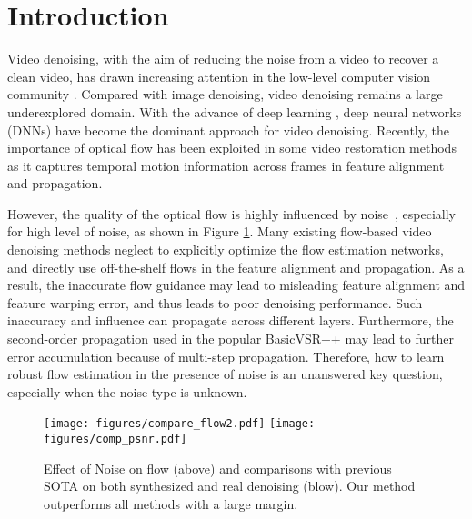 \documentclass[10pt,twocolumn,letterpaper]{article}
\newlength \g
\begin{document}
\section{Introduction}
\label{sec:intro}
\vspace{-2mm}
Video denoising, with the aim of reducing the noise from a video to recover a clean video, has drawn increasing attention in the low-level computer vision community \cite{tassano2019dvdnet,tassano2020fastdvdnet,vaksman2021pacnet,davy2018vnlnet,chan2022basicvsrpp2,lee2021restore,maggioni2021efficient,huang2022neural}.
Compared with image denoising, video denoising remains a large underexplored domain.
With the advance of deep learning \cite{ren2021adaptive,zheng2021deep,zamir2021multi}, deep neural networks (DNNs) \cite{vaksman2021pacnet,tassano2020fastdvdnet,sheth2021unsupervised} have become the dominant approach for video denoising. 
Recently, the importance of optical flow has been exploited in some video restoration methods \cite{wang2019edvr,liang2022vrt,li2022flornn,chan2021basicvsrpp} as it captures temporal motion information across frames in feature alignment and propagation.

However, the quality of the optical flow is highly influenced by noise~\cite{xue2019toflow}, especially for high level of noise, as shown in Figure \ref{fig:noise_flow}.
Many existing flow-based video denoising methods \cite{chan2022basicvsrpp2,liang2022vrt,li2022flornn} neglect to explicitly optimize the flow estimation networks, and directly use off-the-shelf flows in the feature alignment and propagation.
As a result, the inaccurate flow guidance may lead to misleading feature alignment and feature warping error, and thus leads to poor denoising performance.
Such inaccuracy and influence can propagate across different layers.
Furthermore, the second-order propagation used in the popular BasicVSR++ \cite{chan2022basicvsrpp2} may lead to further error accumulation because of multi-step propagation. Therefore, how to learn robust flow estimation in the presence of noise is an unanswered key question, especially when the noise type is unknown. 



\begin{figure}[t]
\begin{center}
\texttt{[image: figures/compare\_flow2.pdf]}
    \vspace{-2mm}
    \texttt{[image: figures/comp\_psnr.pdf]}
    \end{center}
    \vspace{-1mm}
    \caption{Effect of Noise on flow (above) and comparisons with previous SOTA on both synthesized and real denoising (blow). Our method outperforms all methods with a large margin.
    }
    \label{fig:noise_flow}
    \vspace{-6mm}
\end{figure}
\end{document}
